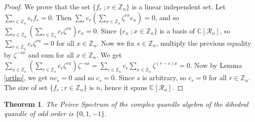 \documentclass[10pt,twoside,reqno]{amsart}
\newtheorem{theorem}{Theorem}[section]
\theoremstyle{definition}
\numberwithin{equation}{section}
\begin{document}
\begin{proof}
We prove that the set $\{f_r\;;r\in \mathbb Z_n\}$ is a linear independent set. Let $\sum\limits_{r\in \mathbb Z_n} c_rf_r=0$. Then $\sum\limits_{r}c_r \left( \sum\limits_{x\in \mathbb Z_n} \zeta^{rx}e_x \right)=0$, and so $\sum\limits_{x\in \mathbb Z_n}\left( \sum\limits_{r\in \mathbb Z_n}c_r\zeta^{rx} \right)e_x=0$. Since $\{e_x\;; x\in \mathbb Z_n\}$ is a basis of $\mathbb C[\mathcal R_n]$, so $\sum\limits_{r\in \mathbb Z_n}c_r\zeta^{rx}=0$ for all $x\in \mathbb Z_n$. Now we fix $s\in \mathbb Z_n$, multiply the previous equality by $\zeta^{-sx}$ and sum for all $x\in \mathbb Z_n$. We get $\sum\limits_{x\in \mathbb Z_n} \left( \sum\limits_{r\in \mathbb Z_n} c_r\zeta^{rx}\right) \zeta^{-sx}= \sum\limits_{r\in \mathbb Z_n} c_r \sum\limits_{x\in \mathbb Z_n}\zeta^{(r-s)x}=0$. Now by Lemma \ref{ortho}, we get $nc_s=0$ and so $c_s=0$. Since $s$ is arbitrary, so $c_r=0$ for all $r\in \mathbb Z_n$. The size of set $\{f_r\;;r\in \mathbb Z_n\}$ is $n$, hence it spans $\mathbb C[\mathcal R_n]$.
\end{proof}


\begin{theorem}
The Peirce Spectrum of the complex quandle algebra of the dihedral quandle of odd order is $\{0,1,-1\}$.
\end{theorem}
\end{document}
